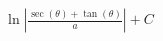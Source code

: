 \documentclass[preview]{standalone}
\begin{document}
\begin{align*}
\ln|\frac{\sec(\theta)+\tan(\theta)}{a}|+C
\end{align*}
\end{document}
